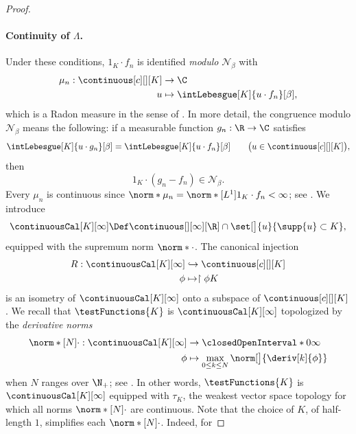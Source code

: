 \begin{proof}
\paragraph{Continuity of $\Lambda$.} 
Under these conditions, $1_K \cdot f_n$ is identified \emph{modulo} $\mathcal{N}_\beta$ with %
% 
\begin{align}
  \mu_n: \continuous[c][][K] &\to \C \\
  u &\mapsto \intLebesgue[K]{u \cdot f_n}[\beta],  \nonumber
\end{align}
% 
which is a Radon measure in the sense of \cite{AnalyseIII}. In more detail, the congruence modulo %
$\mathcal{N}_\beta$ means the following: if a measurable function $g_n: \R \to \C$ satisfies
% 
\begin{equation}
  \intLebesgue[K]{u \cdot g_n}[\beta] = \intLebesgue[K]{u \cdot f_n}[\beta] \qquad\bigl(u \in \continuous[c][][K]\bigr),
\end{equation}
%
then  
%
\begin{equation}
  1_K \cdot (g_n - f_n) \in \mathcal{N}_\beta.
\end{equation}
%
Every $\mu_n$ is continuous since $\norm*{\mu_n} = \norm*[L^1]{1_K \cdot f_n} < \infty$; see . %
We introduce   
% 
\begin{equation}
  \continuousCal[K][\infty] \Def \continuous[][\infty][\R] \cap \set[\big]{u}{\supp{u} \subset K },
\end{equation}
%
equipped with the supremum norm $\norm*{\cdot}$. The canonical injection
% 
\begin{align}
  R : \continuousCal[K][\infty] &\hookrightarrow \continuous[c][][K] \\
  \phi &\mapsto \restriction{\phi}{K} \nonumber
\end{align}
%
is an isometry of $\continuousCal[K][\infty]$ onto a subspace of $\continuous[c][][K]$. We recall that $\testFunctions{K}$ is %
$\continuousCal[K][\infty]$ topologized by the \emph{derivative norms}
% 
\begin{align}
  \norm*[N]{\cdot}: \continuousCal[K][\infty] &\to \closedOpenInterval*{0}{\infty} \\
  \phi &\mapsto \max_{0 \leq k \leq N}\norm[\big]{\deriv[k]{\phi}} \nonumber
\end{align} 
%
when $N$ ranges over $\N_+$; see . In other words, $\testFunctions{K}$ is $\continuousCal[K][\infty]$ %
equipped with $\tau_K$, the weakest vector space topology for which all norms $\norm*[N]{\cdot}$ are continuous. %
Note that the choice of $K$, of half-length $1$, simplifies each $\norm*[N]{\cdot}$. Indeed, for %

\end{proof}

